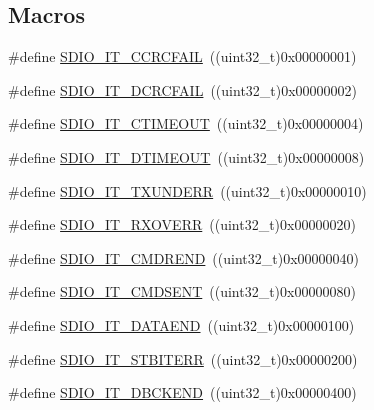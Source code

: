 \subsection*{Macros}
\begin{DoxyCompactItemize}
\item 
\#define \hyperlink{group___s_d_i_o___interrupt__sources_gabb076105e18355a260c40a379511e72f}{S\+D\+I\+O\+\_\+\+I\+T\+\_\+\+C\+C\+R\+C\+F\+A\+IL}~((uint32\+\_\+t)0x00000001)
\item 
\#define \hyperlink{group___s_d_i_o___interrupt__sources_gaf3321305cb4e24419185a4b92ead299a}{S\+D\+I\+O\+\_\+\+I\+T\+\_\+\+D\+C\+R\+C\+F\+A\+IL}~((uint32\+\_\+t)0x00000002)
\item 
\#define \hyperlink{group___s_d_i_o___interrupt__sources_ga3c2fdef0993f10e65d4fddbdf71febed}{S\+D\+I\+O\+\_\+\+I\+T\+\_\+\+C\+T\+I\+M\+E\+O\+UT}~((uint32\+\_\+t)0x00000004)
\item 
\#define \hyperlink{group___s_d_i_o___interrupt__sources_gaf5ce4bfa8459ccbe892791e5cdc26a6f}{S\+D\+I\+O\+\_\+\+I\+T\+\_\+\+D\+T\+I\+M\+E\+O\+UT}~((uint32\+\_\+t)0x00000008)
\item 
\#define \hyperlink{group___s_d_i_o___interrupt__sources_ga93d4dbe3162b8507b2834a3e29e6c648}{S\+D\+I\+O\+\_\+\+I\+T\+\_\+\+T\+X\+U\+N\+D\+E\+RR}~((uint32\+\_\+t)0x00000010)
\item 
\#define \hyperlink{group___s_d_i_o___interrupt__sources_ga272953292e1b43b2108b00e75db76512}{S\+D\+I\+O\+\_\+\+I\+T\+\_\+\+R\+X\+O\+V\+E\+RR}~((uint32\+\_\+t)0x00000020)
\item 
\#define \hyperlink{group___s_d_i_o___interrupt__sources_ga6df3bb694dc00e250cd22e16a03d6910}{S\+D\+I\+O\+\_\+\+I\+T\+\_\+\+C\+M\+D\+R\+E\+ND}~((uint32\+\_\+t)0x00000040)
\item 
\#define \hyperlink{group___s_d_i_o___interrupt__sources_gaf9d8fc4651c4b7555fb9ee4e5af6ca63}{S\+D\+I\+O\+\_\+\+I\+T\+\_\+\+C\+M\+D\+S\+E\+NT}~((uint32\+\_\+t)0x00000080)
\item 
\#define \hyperlink{group___s_d_i_o___interrupt__sources_ga6cc1c521b64fc57b844336f7f175dd1e}{S\+D\+I\+O\+\_\+\+I\+T\+\_\+\+D\+A\+T\+A\+E\+ND}~((uint32\+\_\+t)0x00000100)
\item 
\#define \hyperlink{group___s_d_i_o___interrupt__sources_ga55f7e65ed1b70d5a6abdc3cc41b55766}{S\+D\+I\+O\+\_\+\+I\+T\+\_\+\+S\+T\+B\+I\+T\+E\+RR}~((uint32\+\_\+t)0x00000200)
\item 
\#define \hyperlink{group___s_d_i_o___interrupt__sources_gaa1b1fb453a3ce3b10928aaeada2b2186}{S\+D\+I\+O\+\_\+\+I\+T\+\_\+\+D\+B\+C\+K\+E\+ND}~((uint32\+\_\+t)0x00000400)

\end{DoxyCompactItemize}
